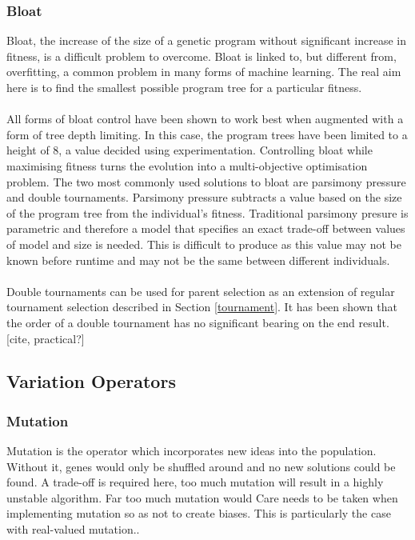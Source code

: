 \documentclass{article}
\begin{document}
\subsubsection{Bloat}%
Bloat, the increase of the size of a genetic program without significant increase in fitness, is a difficult problem to overcome. Bloat is linked to, but different from, overfitting, a common problem in many forms of machine learning\cite{measuring_bloat}. The real aim here is to find the smallest possible program tree for a particular fitness.
\\\\
All forms of bloat control have been shown to work best when augmented with a form of tree depth limiting\cite{parsimony_pressure, bloat_comparison}. In this case, the program trees have been limited to a height of 8, a value decided using experimentation. Controlling bloat while maximising fitness turns the evolution into a multi-objective optimisation problem. The two most commonly used solutions to bloat are parsimony pressure and double tournaments. Parsimony pressure subtracts a value based on the size of the program tree from the individual's fitness. Traditional parsimony presure is parametric and therefore a model that specifies an exact trade-off between values of model and size is needed. This is difficult to produce as this value may not be known before runtime and may not be the same between different individuals\cite{parsimony_pressure}. 
\\\\
Double tournaments can be used for parent selection as an extension of regular tournament selection described in Section \ref{tournament}.
It has been shown that the order of a double tournament has no significant bearing on the end result. [cite, practical?]%


\subsection{Variation Operators}
\subsubsection{Mutation}
\label{mutation}
Mutation is the operator which incorporates new ideas into the population. Without it, genes would only be shuffled around and no new solutions could be found. %
A trade-off is required here, too much mutation will result in a highly unstable algorithm. Far too much mutation would %
Care needs to be taken when implementing mutation so as not to create biases. This is particularly the case with real-valued mutation.. %
\end{document}
